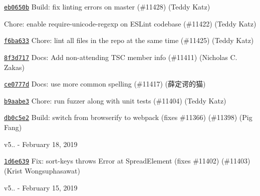 \begin{DoxyItemize}
\item \href{https://github.com/eslint/eslint/commit/eb0650ba20cf9f9ad78dbaccfeb7e0e7ab56e31d}{\texttt{ {\ttfamily eb0650b}}} Build\+: fix linting errors on master (\#11428) (Teddy Katz)
\item \href{https://github.com/eslint/eslint/commit/5018378131fd5190bbccca902c0cf4276ee1581a}{\texttt{ {}}} Chore\+: enable require-\/unicode-\/regexp on ESLint codebase (\#11422) (Teddy Katz)
\item \href{https://github.com/eslint/eslint/commit/f6ba633f56eca6be20fc4b0d9496a78b9498d578}{\texttt{ {\ttfamily f6ba633}}} Chore\+: lint all files in the repo at the same time (\#11425) (Teddy Katz)
\item \href{https://github.com/eslint/eslint/commit/8f3d71754932669332ad7623bcc4c1aef3897125}{\texttt{ {\ttfamily 8f3d717}}} Docs\+: Add non-\/attending TSC member info (\#11411) (Nicholas C. Zakas)
\item \href{https://github.com/eslint/eslint/commit/ce0777da5bc167fe0c529158fd8216d3eaf11565}{\texttt{ {\ttfamily ce0777d}}} Docs\+: use more common spelling (\#11417) (薛定谔的猫)
\item \href{https://github.com/eslint/eslint/commit/b9aabe34311f6189b87c9d8a1aa40f3513fed773}{\texttt{ {\ttfamily b9aabe3}}} Chore\+: run fuzzer along with unit tests (\#11404) (Teddy Katz)
\item \href{https://github.com/eslint/eslint/commit/db0c5e2a7f894b7cda71007b0ba43d7814b3fb2e}{\texttt{ {\ttfamily db0c5e2}}} Build\+: switch from browserify to webpack (fixes \#11366) (\#11398) (Pig Fang)
\end{DoxyItemize}

v5.. -\/ February 18, 2019


\begin{DoxyItemize}
\item \href{https://github.com/eslint/eslint/commit/1d6e63930073e79e52890f552cc6e9a0646b7fb4}{\texttt{ {\ttfamily 1d6e639}}} Fix\+: sort-\/keys throws Error at Spread\+Element (fixes \#11402) (\#11403) (Krist Wongsuphasawat)
\end{DoxyItemize}

v5.. -\/ February 15, 2019


